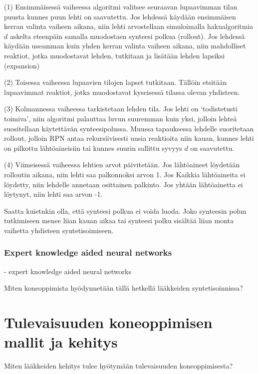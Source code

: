 \documentclass[finnish,twoside,censored,subject,sw-line]{HYthesisML}
\begin{document}
(1) Ensimmäisessä vaiheessa algoritmi valitsee seuraavan lupaavimman tilan puusta kunnes puun lehti on saavutettu.
Jos lehdessä käydään ensimmäisen kerran valinta vaiheen aikana, niin lehti arvostellaan simuloimalla hakualgoritmia
$d$ askelta eteenpäin samalla muodostaen synteesi polkua (rollout). Jos lehdessä käydään useamman kuin yhden
kerran valinta vaiheen aikana, niin mahdolliset reaktiot, jotka muodostavat lehden, tutkitaan ja lisätään lehden
lapsiksi (expansion)

(2) Toisessa vaiheessa lupaavien tilojen lapset tutkitaan. Tällöin etsitään lupaavimmat reaktiot, jotka muodostavat
kyseisessä tilassa olevan yhdisteen.

(3) Kolmannessa vaiheessa tarkistetaan lehden tila. Jos lehti on `todistetusti toimiva', niin algoritmi palauttaa
luvun suuremman kuin yksi, jolloin lehteä suositellaan käytettävän synteesipolussa. Muussa tapauksessa lehdelle
suoritetaan rollout, jolloin RPN antaa rekursiivisesti uusia reaktioita niin kauan, kunnes lehti on pilkottu
lähtöaineisiin tai kunnes suurin sallittu syvyys $d$ on saavutettu.

(4) Viimeisessä vaiheessa lehtien arvot päivitetään. Jos lähtöaineet löydetään rolloutin aikana, niin lehti saa
palkonnoksi arvon 1. Jos Kaikkia lähtöaineita ei löydetty, niin lehdelle annetaan osittainen palkinto. Jos yhtään
lähtöainetta ei löytynyt, niin lehti saa arvon -1.

Saatta kuietnkin olla, että synteesi polkua ei voida luoda. Joko synteesin polun tutkimiseen menee liian kauan
aikaa tai synteesi polku sisältää liian monta vaihetta yhdisteen syntetisoimiseen.

\subsection{Expert knowledge aided neural networks}
- expert knowledge aided neural networks~\cite{10.1145/3450439.3451879}

Miten koneoppimista hyödynnetään tällä hetkellä lääkkeiden syntetisoinnissa?~\cite{SeglerMarwinHS2018Pcsw,10.1145/3219819.3219882,10.1145/3450439.3451879}

\chapter{Tulevaisuuden koneoppimisen mallit ja kehitys}

Miten lääkkeiden kehitys tulee hyötymään tulevaisuuden koneoppimisesta?~\cite{ButlerKeithT2018Mlfm}

\cleardoublepage                          %
{}  %
\printbibliography

\backmatter
\end{document}

